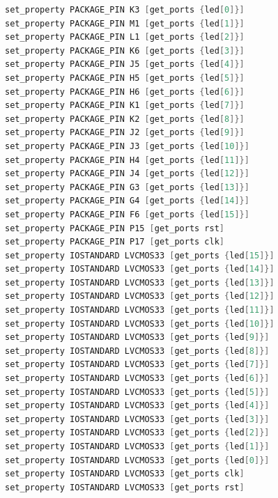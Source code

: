 \documentclass{article}
\begin{document}
\begin{lstlisting}[language=Verilog, caption={流水灯约束文件}]
set_property PACKAGE_PIN K3 [get_ports {led[0]}]
set_property PACKAGE_PIN M1 [get_ports {led[1]}]
set_property PACKAGE_PIN L1 [get_ports {led[2]}]
set_property PACKAGE_PIN K6 [get_ports {led[3]}]
set_property PACKAGE_PIN J5 [get_ports {led[4]}]
set_property PACKAGE_PIN H5 [get_ports {led[5]}]
set_property PACKAGE_PIN H6 [get_ports {led[6]}]
set_property PACKAGE_PIN K1 [get_ports {led[7]}]
set_property PACKAGE_PIN K2 [get_ports {led[8]}]
set_property PACKAGE_PIN J2 [get_ports {led[9]}]
set_property PACKAGE_PIN J3 [get_ports {led[10]}]
set_property PACKAGE_PIN H4 [get_ports {led[11]}]
set_property PACKAGE_PIN J4 [get_ports {led[12]}]
set_property PACKAGE_PIN G3 [get_ports {led[13]}]
set_property PACKAGE_PIN G4 [get_ports {led[14]}]
set_property PACKAGE_PIN F6 [get_ports {led[15]}]
set_property PACKAGE_PIN P15 [get_ports rst]
set_property PACKAGE_PIN P17 [get_ports clk]
set_property IOSTANDARD LVCMOS33 [get_ports {led[15]}]
set_property IOSTANDARD LVCMOS33 [get_ports {led[14]}]
set_property IOSTANDARD LVCMOS33 [get_ports {led[13]}]
set_property IOSTANDARD LVCMOS33 [get_ports {led[12]}]
set_property IOSTANDARD LVCMOS33 [get_ports {led[11]}]
set_property IOSTANDARD LVCMOS33 [get_ports {led[10]}]
set_property IOSTANDARD LVCMOS33 [get_ports {led[9]}]
set_property IOSTANDARD LVCMOS33 [get_ports {led[8]}]
set_property IOSTANDARD LVCMOS33 [get_ports {led[7]}]
set_property IOSTANDARD LVCMOS33 [get_ports {led[6]}]
set_property IOSTANDARD LVCMOS33 [get_ports {led[5]}]
set_property IOSTANDARD LVCMOS33 [get_ports {led[4]}]
set_property IOSTANDARD LVCMOS33 [get_ports {led[3]}]
set_property IOSTANDARD LVCMOS33 [get_ports {led[2]}]
set_property IOSTANDARD LVCMOS33 [get_ports {led[1]}]
set_property IOSTANDARD LVCMOS33 [get_ports {led[0]}]
set_property IOSTANDARD LVCMOS33 [get_ports clk]
set_property IOSTANDARD LVCMOS33 [get_ports rst]
\end{lstlisting}
\end{document}
